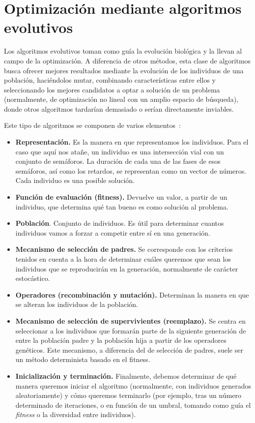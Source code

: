 \section{Optimización mediante algoritmos evolutivos}

Los algoritmos evolutivos toman como guía la evolución biológica y la llevan al campo de la optimización. A diferencia de otros métodos, esta clase de algoritmos busca ofrecer mejores resultados mediante la evolución de los individuos de una población, haciéndolos mutar, combinando características entre ellos y seleccionando los mejores candidatos a optar a solución de un problema~\cite{eiben_introduction_2003} (normalmente, de optimización no lineal con un amplio espacio de búsqueda), donde otros algoritmos tardarían demasiado o serían directamente inviables.

Este tipo de algoritmos se componen de varios elementos~\cite{eiben_introduction_2003}:

\begin{itemize}
    \item \textbf{Representación.} Es la manera en que representamos los individuos. Para el caso que aquí nos atañe, un individuo es una intersección vial con un conjunto de semáforos. La duración de cada una de las fases de esos semáforos, así como los retardos, se representan como un vector de números. Cada individuo es una posible solución.
    \item \textbf{Función de evaluación (fitness).} Devuelve un valor, a partir de un individuo, que determina qué tan bueno es como solución al problema.
    \item \textbf{Población}. Conjunto de individuos. Es útil para determinar cuantos individuos vamos a forzar a competir entre sí en una generación.
    \item \textbf{Mecanismo de selección de padres.} Se corresponde con los criterios tenidos en cuenta a la hora de determinar cuáles queremos que sean los individuos que se reproducirán en la generación, normalmente de carácter estocástico.
    \item \textbf{Operadores (recombinación y mutación).} Determinan la manera en que se alteran los individuos de la población.
    \item \textbf{Mecanismo de selección de supervivientes (reemplazo).} Se centra en seleccionar a los individuos que formarán parte de la siguiente generación de entre la población padre y la población hija a partir de los operadores genéticos. Este mecanismo, a diferencia del de selección de padres, suele ser un método determinista basado en el fitness.
    \item \textbf{Inicialización y terminación.} Finalmente, debemos determinar de qué manera queremos iniciar el algoritmo (normalmente, con individuos generados aleatoriamente) y cómo queremos terminarlo (por ejemplo, tras un número determinado de iteraciones, o en función de un umbral, tomando como guía el \textit{fitness} o la diversidad entre individuos).
\end{itemize}


